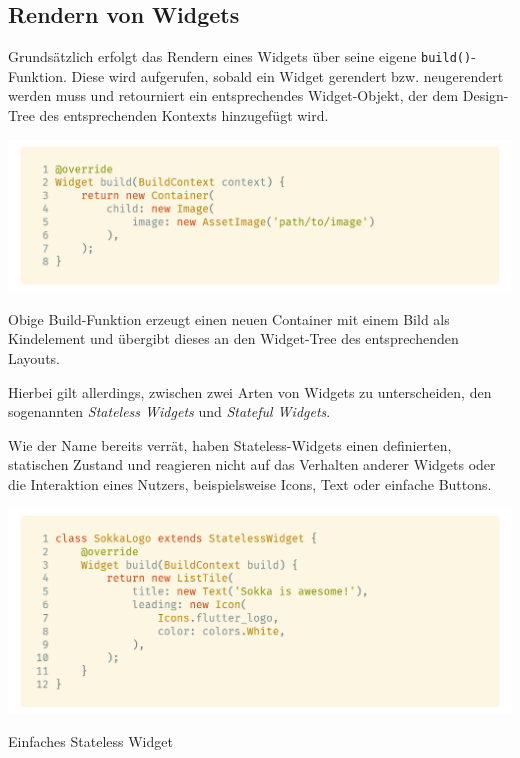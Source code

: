 
\subsection{Rendern von Widgets}

Grundsätzlich erfolgt das Rendern eines Widgets über seine eigene \lstinline{build()}-Funktion. Diese wird aufgerufen,
sobald ein Widget gerendert bzw. neugerendert werden muss und retourniert ein entsprechendes Widget-Objekt,
der dem Design-Tree des entsprechenden Kontexts hinzugefügt wird.

\begin{code}
    \centering
    \includegraphics[width=1\textwidth]{images/Flutter/flutterBuildFunction.png}
    \caption{\lstinline{build()}-Funktion eines Widgets}
\end{code}

Obige Build-Funktion erzeugt einen neuen Container mit einem Bild als Kindelement und übergibt dieses
an den Widget-Tree des entsprechenden Layouts.

Hierbei gilt allerdings, zwischen zwei Arten von Widgets zu unterscheiden, den sogenannten \textit{Stateless Widgets}
und \textit{Stateful Widgets}.

Wie der Name bereits verrät, haben Stateless-Widgets einen definierten, statischen Zustand und reagieren nicht
auf das Verhalten anderer Widgets oder die Interaktion eines Nutzers, beispielsweise Icons, Text oder einfache
Buttons.

\begin{code}
    \centering
    \includegraphics[width=1\textwidth]{images/Flutter/flutterStatelessWidget.png}
    \caption{Einfaches Stateless Widget}
\end{code}

